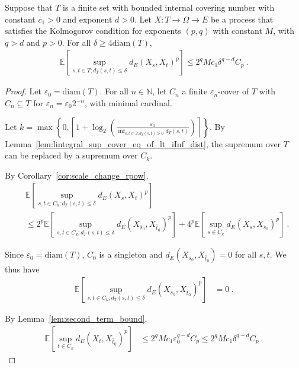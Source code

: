 \begin{theorem}\label{thm:finite_set_bound_of_dist_le_of_diam_le}
  \leanok
Suppose that $T$ is a finite set with bounded internal covering number with constant $c_1>0$ and exponent $d > 0$.
Let $X : T \to \Omega \to E$ be a process that satisfies the Kolmogorov condition for exponents $(p,q)$ with constant $M$, with $q > d$ and $p > 0$.
For all $\delta \ge 4\mathrm{diam}(T)$,
\begin{align*}
  \mathbb{E}\left[ \sup_{s, t \in T; d_T(s, t) \le \delta} d_E(X_s, X_t)^p \right]
  \le 2^q M c_1 \delta^{q - d} C_p
  \: .
\end{align*}
\end{theorem}

\begin{proof}
Let $\varepsilon_0 = \mathrm{diam}(T)$.
For all $n \in \mathbb{N}$, let $C_n$ a finite $\varepsilon_n$-cover of $T$ with $C_n \subseteq T$ for $\varepsilon_n = \varepsilon_0 2^{-n}$, with minimal cardinal.

Let $k = \max \left\{ 0, \left\lceil 1 + \log_2\left(\frac{\varepsilon_0}{\inf_{s, t \in J; d_T(s,t)>0}d_T(s, t)}\right) \right\rceil \right\}$.
By Lemma~\ref{lem:lintegral_sup_cover_eq_of_lt_iInf_dist}, the supremum over $T$ can be replaced by a supremum over $C_k$.

By Corollary~\ref{cor:scale_change_rpow},
\begin{align*}
  &\mathbb{E}\left[ \sup_{s, t \in C_k; d_T(s, t) \le \delta} d_E(X_s, X_t)^p \right]
  \\
  &\le 2^p \mathbb{E}\left[ \sup_{s, t \in C_k; d_T(s, t) \le \delta} d_E(X_{\bar{s}_0}, X_{\bar{t}_0})^p \right]
    + 4^p \mathbb{E}\left[ \sup_{s \in C_k} d_E(X_s, X_{\bar{s}_0})^p \right]
  \: .
\end{align*}

Since $\varepsilon_0 = \mathrm{diam}(T)$, $C_0$ is a singleton and $d_E(X_{\bar{s}_0}, X_{\bar{t}_0}) = 0$ for all $s, t$.
We thus have
\begin{align*}
  \mathbb{E} \left[ \sup_{s, t \in C_k; d_T(s, t) \le \delta} d_E(X_{\bar{s}_0}, X_{\bar{t}_0})^p \right]
  &= 0
  \: .
\end{align*}

By Lemma~\ref{lem:second_term_bound},
\begin{align*}
  \mathbb{E} \left[\sup_{t \in C_k} d_E(X_t, X_{\bar{t}_0})^p \right]
  &\le 2^q M c_1 \varepsilon_0^{q - d} C_p
  \le 2^q M c_1 \delta^{q - d} C_p
  \: .
\end{align*}
\end{proof}


